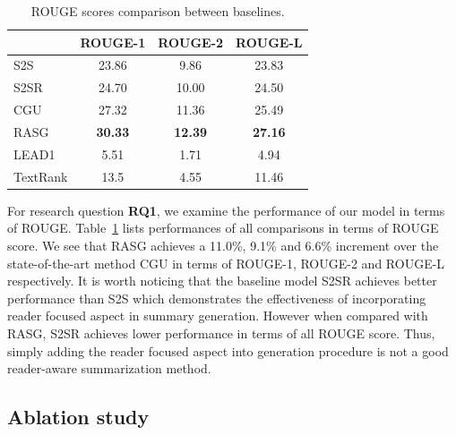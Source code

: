 \documentclass[letterpaper]{article} %
\newcommand{\dubbelop}{$^{\blacktriangle}$}
\begin{document}
\newcommand{\cbkgrnd}{\cellcolor{blue!15}}
\newcommand{\phantomtriangle}{\phantom{\dubbelop}}
\begin{table}[t]
\centering
\small
\caption{ROUGE scores comparison between baselines.}
\begin{tabular}{@{}l ccc @{}}
\toprule
& ROUGE-1 & ROUGE-2 & ROUGE-L \\
\midrule
S2S &  23.86 & 9.86 & 23.83 \\
S2SR &  24.70 & 10.00 & 24.50 \\
CGU & 27.32 & 11.36 & 25.49  \\
RASG & \textbf{30.33} & \textbf{12.39} & \textbf{27.16} \\
\midrule
LEAD1 & 5.51 & 1.71 & 4.94 \\
TextRank & 13.5 & 4.55 & 11.46 \\
\bottomrule
\end{tabular}
\label{tab:comp_rouge_baselines}
\end{table}

For research question \textbf{RQ1}, we examine the performance of our model in terms of ROUGE. 
Table~\ref{tab:comp_rouge_baselines} lists performances of all comparisons in terms of ROUGE score.
We see that RASG achieves a 11.0\%, 9.1\% and 6.6\% increment over the state-of-the-art method CGU in terms of ROUGE-1, ROUGE-2 and ROUGE-L respectively.
It is worth noticing that the baseline model S2SR achieves better performance than S2S which demonstrates the effectiveness of incorporating reader focused aspect in summary generation.
However when compared with RASG, S2SR achieves lower performance in terms of all ROUGE score.
Thus, simply adding the reader focused aspect into generation procedure is not a good reader-aware summarization method.

\subsection{Ablation study}
\end{document}
